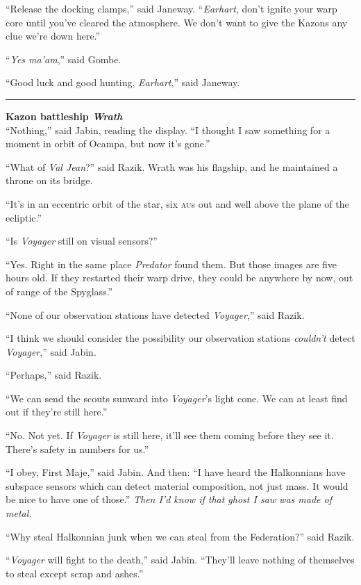 \documentclass[twoside,letterpaper,12pt]{memoir}
\begin{document}
``Release the docking clamps,'' said Janeway. ``\textit{Earhart}, don't ignite your warp core until you've cleared the atmosphere. We don't want to give the Kazons any clue we're down here.''

``\textit{Yes ma'am},'' said Gombe.

``Good luck and good hunting, \textit{Earhart},'' said Janeway.

\fancybreak{\rule{3cm}{0.4 pt}}
\noindent\textbf{Kazon battleship \textit{Wrath}}\\

``Nothing,'' said Jabin, reading the display. ``I thought I saw something for a moment in orbit of Ocampa, but now it’s gone.''

``What of \textit{Val Jean}?'' said Razik. Wrath was his flagship, and he maintained a throne on its bridge.

``It's in an eccentric orbit of the star, six \textsc{au}s out and well above the plane of the ecliptic.''

``Is \textit{Voyager} still on visual sensors?''

``Yes. Right in the same place \textit{Predator} found them. But those images are five hours old. If they restarted their warp drive, they could be anywhere by now, out of range of the Spyglass.''

``None of our observation stations have detected \textit{Voyager},'' said Razik.

``I think we should consider the possibility our observation stations \textit{couldn't} detect \textit{Voyager},'' said Jabin.

``Perhaps,'' said Razik.

``We can send the scouts sunward into \textit{Voyager}'s light cone. We can at least find out if they're still here.''

``No. Not yet. If \textit{Voyager} is still here, it'll see them coming before they see it. There's safety in numbers for us.''

``I obey, First Maje,'' said Jabin. And then: ``I have heard the Halkonnians have subspace sensors which can detect material composition, not just mass. It would be nice to have one of those.'' \textit{Then I’d know if that ghost I saw was made of metal.}

``Why steal Halkonnian junk when we can steal from the Federation?'' said Razik.

``\textit{Voyager} will fight to the death,'' said Jabin. ``They'll leave nothing of themselves to steal except scrap and ashes.''
\end{document}
